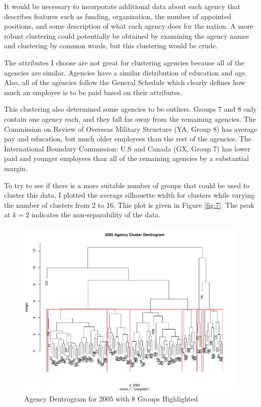 \documentclass{article}
\begin{document}
    \par
    It would be necessary to incorporate additional data about each agency that describes features such as funding, organization, the number of appointed positions, and some description of what each agency does for the nation. A more robust clustering could potentially be obtained by examining the agency names and clustering by common words, but this clustering would be crude.
    \par
    The attributes I choose are not great for clustering agencies because all of the agencies are similar. Agencies have a similar distribution of education and age. Also, all of the agencies follow the General Schedule which clearly defines how much an employee is to be paid based on their attributes.
    \par
    This clustering also determined some agencies to be outliers. Groups 7 and 8 only contain one agency each, and they fall far away from the remaining agencies. The Commission on Review of Overseas Military Structure (YA, Group 8) has average pay and education, but much older employees than the rest of the agencies. The International Boundary Commission: U.S and Canada (GX, Group 7) has lower paid and younger employees than all of the remaining agencies by a substantial margin.
    \par
    To try to see if there is a more suitable number of groups that could be used to cluster this data, I plotted the average silhouette width for clusters while varying the number of clusters from 2 to 16. This plot is given in Figure \ref{fig:7}. The peak at $k = 2$ indicates the non-separability of the data.

    \begin{center}
        \begin{figure}
            \includegraphics[scale=0.4]{./images/2005-dentrogram.pdf}
            \caption{Agency Dentrogram for 2005 with 8 Groups Highlighted}
            \label{fig:4}
        \end{figure}
    \end{center}
\end{document}
